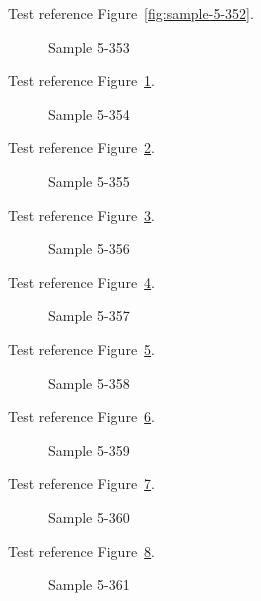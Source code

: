 Test reference Figure~\ref{fig:sample-5-352}.

\begin{figure}[tbhp]
\caption{Sample 5-353}
\label{fig:sample-5-353}
\end{figure}

Test reference Figure~\ref{fig:sample-5-353}.

\begin{figure}[tbhp]
\caption{Sample 5-354}
\label{fig:sample-5-354}
\end{figure}

Test reference Figure~\ref{fig:sample-5-354}.

\begin{figure}[tbhp]
\caption{Sample 5-355}
\label{fig:sample-5-355}
\end{figure}

Test reference Figure~\ref{fig:sample-5-355}.

\begin{figure}[tbhp]
\caption{Sample 5-356}
\label{fig:sample-5-356}
\end{figure}

Test reference Figure~\ref{fig:sample-5-356}.

\begin{figure}[tbhp]
\caption{Sample 5-357}
\label{fig:sample-5-357}
\end{figure}

Test reference Figure~\ref{fig:sample-5-357}.

\begin{figure}[tbhp]
\caption{Sample 5-358}
\label{fig:sample-5-358}
\end{figure}

Test reference Figure~\ref{fig:sample-5-358}.

\begin{figure}[tbhp]
\caption{Sample 5-359}
\label{fig:sample-5-359}
\end{figure}

Test reference Figure~\ref{fig:sample-5-359}.

\begin{figure}[tbhp]
\caption{Sample 5-360}
\label{fig:sample-5-360}
\end{figure}

Test reference Figure~\ref{fig:sample-5-360}.

\begin{figure}[tbhp]
\caption{Sample 5-361}
\label{fig:sample-5-361}
\end{figure}

